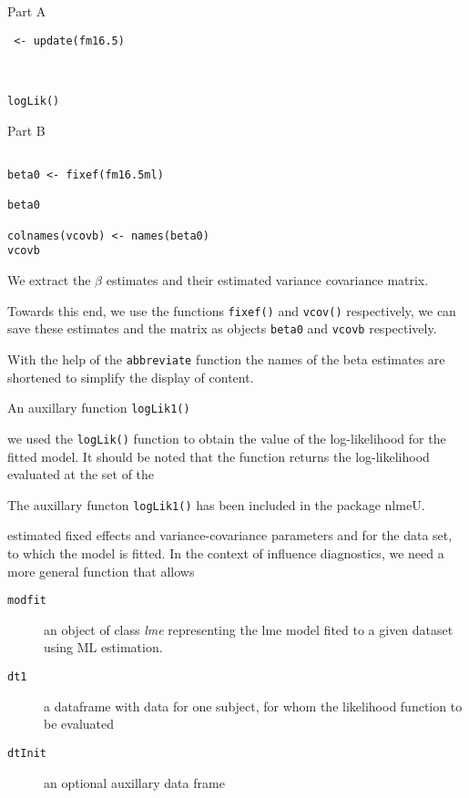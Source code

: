 \documentclass[a4paper,12pt]{article}
\begin{document}
Part A
\begin{framed}
\begin{verbatim}
 <- update(fm16.5)


  
logLik()
\end{verbatim}
\end{framed}


Part B

\begin{framed}
\begin{verbatim}

beta0 <- fixef(fm16.5ml)

beta0

colnames(vcovb) <- names(beta0)
vcovb

\end{verbatim}
\end{framed}

We extract the \textbf{$\beta$} estimates and their estimated variance covariance matrix.

Towards this end, we use the functions \texttt{fixef()} and \texttt{vcov()} respectively, we can save these estimates and the matrix as objects \texttt{beta0} and 
\texttt{vcovb} respectively.

With the help of the \texttt{abbreviate} function the names of the beta estimates are shortened to simplify the display of content.

An auxillary function \texttt{logLik1()}

we used the \texttt{logLik()} function to obtain the value of the log-likelihood for the fitted model.
It should be noted that the function returns the log-likelihood evaluated at the set of the


The auxillary functon \texttt{logLik1()} has been included in the package nlmeU.

estimated fixed effects and variance-covariance parameters and for the data set, to which the model
is fitted. In the context of influence diagnostics, we need a more general function that allows




\begin{description}
\item[ \texttt{modfit} ] an object of class \textit{lme} representing the lme model fited to a given dataset using ML estimation.
\item[ \texttt{dt1}] a dataframe with data for one subject, for whom the likelihood function to be evaluated
\item[ \texttt{dtInit }] an optional auxillary data frame
\end{description}
\end{document}
